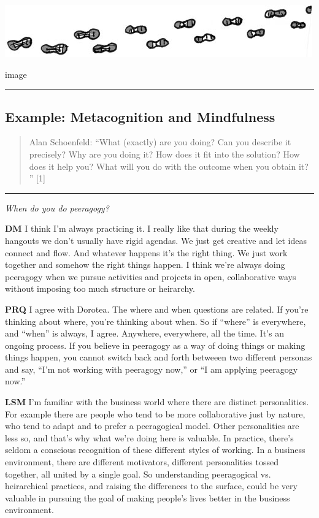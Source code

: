 \includegraphics{../pictures/footprints.jpg}

image

\begin{center}\rule{0.5\linewidth}{\linethickness}\end{center}

\subsection{Example: Metacognition and
Mindfulness}\label{example-metacognition-and-mindfulness}

\begin{quote}
Alan Schoenfeld: ``What (exactly) are you doing? Can you describe it
precisely? Why are you doing it? How does it fit into the solution? How
does it help you? What will you do with the outcome when you obtain it?
'' {[}1{]}
\end{quote}

\begin{center}\rule{0.5\linewidth}{\linethickness}\end{center}

\emph{When do you do peeragogy?}

\textbf{DM} I think I'm always practicing it. I really like that during
the weekly hangouts we don't usually have rigid agendas. We just get
creative and let ideas connect and flow. And whatever happens it's the
right thing. We just work together and somehow the right things happen.
I think we're always doing peeragogy when we pursue activities and
projects in open, collaborative ways without imposing too much structure
or heirarchy.

\textbf{PRQ} I agree with Dorotea. The where and when questions are
related. If you're thinking about where, you're thinking about when. So
if ``where'' is everywhere, and ``when'' is always, I agree. Anywhere,
everywhere, all the time. It's an ongoing process. If you believe in
peeragogy as a way of doing things or making things happen, you cannot
switch back and forth betweeen two different personas and say, ``I'm not
working with peeragogy now,'' or ``I am applying peeragogy now.''

\textbf{LSM} I'm familiar with the business world where there are
distinct personalities. For example there are people who tend to be more
collaborative just by nature, who tend to adapt and to prefer a
peeragogical model. Other personalities are less so, and that's why what
we're doing here is valuable. In practice, there's seldom a conscious
recognition of these different styles of working. In a business
environment, there are different motivators, different personalities
tossed together, all united by a single goal. So understanding
peeragogical vs. heirarchical practices, and raising the differences to
the surface, could be very valuable in pursuing the goal of making
people's lives better in the business environment.

